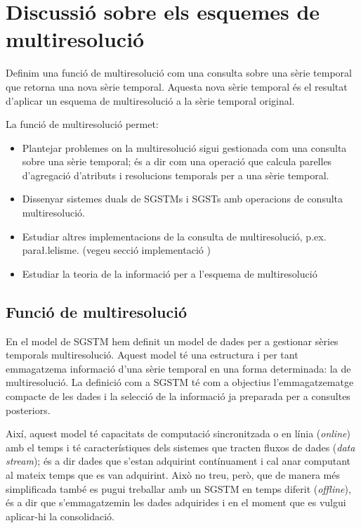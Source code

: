 
\chapter{Discussió sobre els esquemes de multiresolució}

\todo{}


Definim una funció de multiresolució com una consulta sobre una sèrie
temporal que retorna una nova sèrie temporal. Aquesta nova sèrie
temporal és el resultat d'aplicar un esquema de multiresolució a la
sèrie temporal original.



La funció de multiresolució permet:

\begin{itemize}

\item Plantejar problemes on la multiresolució sigui gestionada com una consulta
  sobre una sèrie temporal; és a dir com una operació que calcula
  parelles d'agregació d'atributs i resolucions temporals per a una
  sèrie temporal.

\item Dissenyar sistemes duals de \glspl{SGSTM} i \glspl{SGST} amb operacions
  de consulta multiresolució.

\item Estudiar altres implementacions de la consulta de multiresolució, p.ex. para\l.lelisme. (vegeu secció implementació \todo{})

\item Estudiar la teoria de la informació per a l'esquema de
  multiresolució

\end{itemize}





\section{Funció de multiresolució}
\label{sec:multiresolucio:funcio}

En el model de \gls{SGSTM} hem definit un model de dades per a
gestionar sèries temporals multiresolució. Aquest model té una
estructura i per tant emmagatzema informació d'una sèrie temporal en
una forma determinada: la de multiresolució.  La definició com a
\gls{SGSTM} té com a objectius l'emmagatzematge compacte de les dades
i la selecció de la informació ja preparada per a consultes
posteriors.

Així, aquest model té capacitats de computació
sincronitzada o en línia (\emph{online}) amb el temps i té
característiques dels sistemes que tracten fluxos de dades (\emph{data
  stream}); és a dir dades que s'estan adquirint contínuament i cal
anar computant al mateix temps que es van adquirint. Això no treu,
però, que de manera més simplificada també es pugui treballar amb un
\gls{SGSTM} en temps diferit (\emph{offline}), és a dir que
s'emmagatzemin les dades adquirides i en el moment que es vulgui
aplicar-hi la consolidació.




